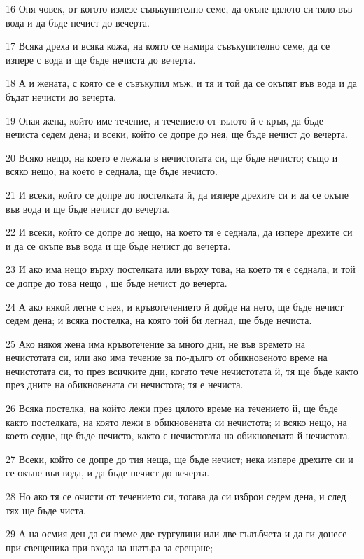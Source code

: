 \par 16 Оня човек, от когото излезе съвъкупително семе, да окъпе цялото си тяло във вода и да бъде нечист до вечерта.
\par 17 Всяка дреха и всяка кожа, на която се намира съвъкупително семе, да се изпере с вода и ще бъде нечиста до вечерта.
\par 18 А и жената, с която се е съвъкупил мъж, и тя и той да се окъпят във вода и да бъдат нечисти до вечерта.
\par 19 Оная жена, който име течение, и течението от тялото й е кръв, да бъде нечиста седем дена; и всеки, който се допре до нея, ще бъде нечист до вечерта.
\par 20 Всяко нещо, на което е лежала в нечистотата си, ще бъде нечисто; също и всяко нещо, на което е седнала, ще бъде нечисто.
\par 21 И всеки, който се допре до постелката й, да изпере дрехите си и да се окъпе във вода и ще бъде нечист до вечерта.
\par 22 И всеки, който се допре до нещо, на което тя е седнала, да изпере дрехите си и да се окъпе във вода и ще бъде нечист до вечерта.
\par 23 И ако има нещо върху постелката или върху това, на което тя е седнала, и той се допре до това нещо , ще бъде нечист до вечерта.
\par 24 А ако някой легне с нея, и кръвотечението й дойде на него, ще бъде нечист седем дена; и всяка постелка, на която той би легнал, ще бъде нечиста.
\par 25 Ако някоя жена има кръвотечение за много дни, не във времето на нечистотата си, или ако има течение за по-дълго от обикновеното време на нечистотата си, то през всичките дни, когато тече нечистотата й, тя ще бъде както през дните на обикновената си нечистота; тя е нечиста.
\par 26 Всяка постелка, на който лежи през цялото време на течението й, ще бъде както постелката, на която лежи в обикновената си нечистота; и всяко нещо, на което седне, ще бъде нечисто, както с нечистотата на обикновената й нечистота.
\par 27 Всеки, който се допре до тия неща, ще бъде нечист; нека изпере дрехите си и се окъпе във вода, и да бъде нечист до вечерта.
\par 28 Но ако тя се очисти от течението си, тогава да си изброи седем дена, и след тях ще бъде чиста.
\par 29 А на осмия ден да си вземе две гургулици или две гълъбчета и да ги донесе при свещеника при входа на шатъра за срещане;
